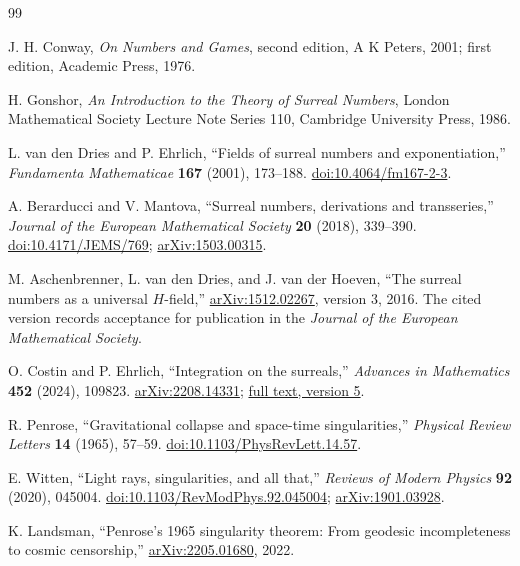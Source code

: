\documentclass[11pt,letterpaper]{article}
\theoremstyle{definition}
\theoremstyle{remark}
\begin{document}
\clearpage
{}
{}
\begingroup
\raggedright
\begin{thebibliography}{99}
\setlength{\itemsep}{0.45em}

J. H. Conway, \emph{On Numbers and Games}, second edition,
A K Peters, 2001; first edition, Academic Press, 1976.

H. Gonshor, \emph{An Introduction to the Theory of Surreal Numbers},
London Mathematical Society Lecture Note Series 110,
Cambridge University Press, 1986.

L. van den Dries and P. Ehrlich,
``Fields of surreal numbers and exponentiation,''
\emph{Fundamenta Mathematicae} \textbf{167} (2001), 173--188.
\href{https://doi.org/10.4064/fm167-2-3}{doi:10.4064/fm167-2-3}.

A. Berarducci and V. Mantova,
``Surreal numbers, derivations and transseries,''
\emph{Journal of the European Mathematical Society} \textbf{20} (2018), 339--390.
\href{https://doi.org/10.4171/JEMS/769}{doi:10.4171/JEMS/769};
\href{https://arxiv.org/abs/1503.00315}{arXiv:1503.00315}.

M. Aschenbrenner, L. van den Dries, and J. van der Hoeven,
``The surreal numbers as a universal $H$-field,''
\href{https://arxiv.org/abs/1512.02267}{arXiv:1512.02267},
version 3, 2016. The cited version records acceptance for publication in the
\emph{Journal of the European Mathematical Society}.

O. Costin and P. Ehrlich,
``Integration on the surreals,''
\emph{Advances in Mathematics} \textbf{452} (2024), 109823.
\href{https://arxiv.org/abs/2208.14331}{arXiv:2208.14331};
\href{https://arxiv.org/html/2208.14331v5}{full text, version 5}.

R. Penrose, ``Gravitational collapse and space-time singularities,''
\emph{Physical Review Letters} \textbf{14} (1965), 57--59.
\href{https://doi.org/10.1103/PhysRevLett.14.57}{doi:10.1103/PhysRevLett.14.57}.

E. Witten, ``Light rays, singularities, and all that,''
\emph{Reviews of Modern Physics} \textbf{92} (2020), 045004.
\href{https://doi.org/10.1103/RevModPhys.92.045004}{doi:10.1103/RevModPhys.92.045004};
\href{https://arxiv.org/abs/1901.03928}{arXiv:1901.03928}.

K. Landsman, ``Penrose's 1965 singularity theorem: From geodesic incompleteness
to cosmic censorship,''
\href{https://arxiv.org/abs/2205.01680}{arXiv:2205.01680}, 2022.


\end{thebibliography}
\end{document}
